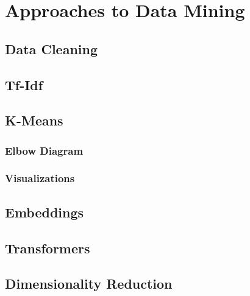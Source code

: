 \chapter{Approaches to Data Mining}
\section{Data Cleaning}
\section{Tf-Idf}
\section{K-Means}
\subsection{Elbow Diagram}
\subsection{Visualizations}
\section{Embeddings}
\section{Transformers}
\section{Dimensionality Reduction}